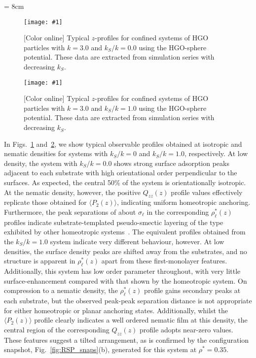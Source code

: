 \documentclass[aps,10pt,twocolumn]{revtex4}
\newcommand{\sel}{\sigma_\ell}
\newlength{\picW}   %
\newcommand{\pic}[1]{\texttt{[image: \#1]}}
\begin{document}
\picW = 8cm
\begin{figure}
    \centering
    \pic{fig_01.ps}
    \caption{[Color online] Typical $z$-profiles for confined systems of HGO particles with
    $k=3.0$ and $k_S/k = 0.0$ using the HGO-sphere potential.
    These data are extracted from simulation series with decreasing $k_S$.}
    \label{fig:RSP_typeProf_k3_homeo}
\end{figure}

\begin{figure}
    \centering
    \pic{fig_02.ps}
    \caption{[Color online] Typical $z$-profiles for confined systems of HGO particles with
    $k=3.0$ and $k_S/k = 1.0$ using the HGO-sphere potential.
    These data are extracted from simulation series with decreasing $k_S$.}
    \label{fig:RSP_typeProf_k3_planar}
\end{figure}

In Figs.~\ref{fig:RSP_typeProf_k3_homeo} and~\ref{fig:RSP_typeProf_k3_planar}, we show typical observable profiles
obtained at isotropic and nematic densities for systems with $k_S/k=0$ and $k_S/k=1.0$, respectively. At low
density, the system with $k_S/k = 0.0$ shows strong surface adsorption peaks adjacent to each substrate with high
orientational order perpendicular to the surfaces. As expected, the central 50\% of the system is orientationally
isotropic. At the nematic density, however, the positive $Q_{zz}(z)$ profile values effectively replicate those
obtained for $\langle P_2(z)\rangle$, indicating uniform homeotropic anchoring. Furthermore, the peak separations
of about $\sel$ in the corresponding $\rho^{*}_\ell(z)$ profiles indicate substrate-templated pseudo-smectic
layering of the type exhibited by other homeotropic systems~\cite{WallCleaver97,BarmesCleaver04a}. The equivalent
profiles obtained from the $k_S/k=1.0$ system indicate very different behaviour, however. At low densities, the
surface density peaks are shifted away from the substrates, and no structure is apparent in $\rho^{*}_\ell(z)$
apart from these first-monolayer features. Additionally, this system has low order parameter throughout, with very
little surface-enhancement compared with that shown by the homeotropic system. On compression to a nematic
density, the $\rho^{*}_\ell(z)$ profile gains secondary peaks at each substrate, but the observed peak-peak
separation distance is not appropriate for either homeotropic or planar anchoring states. Additionally, whilst the
$\langle P_2(z)\rangle$ profile clearly indicates a well ordered nematic film at this density, the central region
of the corresponding $Q_{zz}(z)$ profile adopts near-zero values. These features suggest a tilted arrangement, as
is confirmed by the configuration snapshot, Fig.~\ref{fig:RSP_snaps}(b), generated for this system at
$\rho^{*}=0.35$.
\end{document}
